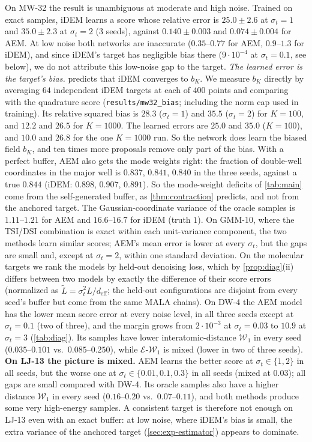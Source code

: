 On MW-32 the result is unambiguous at moderate and high noise. Trained on exact samples, iDEM learns a score whose relative error is $25.0\pm2.6$ at $\sigma_t=1$ and $35.0\pm2.3$ at $\sigma_t=2$ (3 seeds), against $0.140\pm0.003$ and $0.074\pm0.004$ for AEM. At low noise both networks are inaccurate ($0.35$--$0.77$ for AEM, $0.9$--$1.3$ for iDEM), and since iDEM's target has negligible bias there ($9\cdot10^{-4}$ at $\sigma_t=0.1$, see below), we do not attribute this low-noise gap to the target.
\emph{The learned error is the target's bias.}  predicts that iDEM converges to $b_K$. We measure $b_K$ directly by averaging $64$ independent iDEM targets at each of $400$ points and comparing with the quadrature score (\texttt{results/mw32\_bias}; including the norm cap used in training). Its relative squared bias is $28.3$ ($\sigma_t=1$) and $35.5$ ($\sigma_t=2$) for $K=100$, and $12.2$ and $26.5$ for $K=1000$. The learned errors are $25.0$ and $35.0$ ($K=100$), and $10.0$ and $26.8$ for the one $K=1000$ run. So the network does learn the biased field $b_K$, and ten times more proposals remove only part of the bias.
With a perfect buffer, AEM also gets the mode weights right: the fraction of double-well coordinates in the major well is $0.837$, $0.841$, $0.840$ in the three seeds, against a true $0.844$ (iDEM: $0.898$, $0.907$, $0.891$). So the mode-weight deficits of \cref{tab:main} come from the self-generated buffer, as \cref{thm:contraction} predicts, and not from the anchored target. The Gaussian-coordinate variance of the oracle samples is $1.11$--$1.21$ for AEM and $16.6$--$16.7$ for iDEM (truth $1$).
On GMM-10, where the TSI/DSI combination is exact within each unit-variance component, the two methods learn similar scores; AEM's mean error is lower at every $\sigma_t$, but the gaps are small and, except at $\sigma_t=2$, within one standard deviation.
On the molecular targets we rank the models by held-out denoising loss, which by \cref{prop:diag}(ii) differs between two models by exactly the difference of their score errors (normalized as $\tilde L=\sigma_t^2L/d_{\mathrm{eff}}$; the held-out configurations are disjoint from every seed's buffer but come from the same MALA chains). On DW-4 the AEM model has the lower mean score error at every noise level, in all three seeds except at $\sigma_t=0.1$ (two of three), and the margin grows from $2\cdot10^{-3}$ at $\sigma_t=0.03$ to $10.9$ at $\sigma_t=3$ (\cref{tab:diag}). Its samples have lower interatomic-distance $\mathcal{W}_1$ in every seed ($0.035$--$0.101$ vs.\ $0.085$--$0.250$), while $\mathcal{E}$-$\mathcal{W}_1$ is mixed (lower in two of three seeds).
\textbf{On LJ-13 the picture is mixed.} AEM learns the better score at $\sigma_t\in\{1,2\}$ in all seeds, but the worse one at $\sigma_t\in\{0.01,0.1,0.3\}$ in all seeds (mixed at $0.03$); all gaps are small compared with DW-4. Its oracle samples also have a higher distance $\mathcal{W}_1$ in every seed ($0.16$--$0.20$ vs.\ $0.07$--$0.11$), and both methods produce some very high-energy samples. A consistent target is therefore not enough on LJ-13 even with an exact buffer: at low noise, where iDEM's bias is small, the extra variance of the anchored target (\cref{sec:exp-estimator}) appears to dominate.
